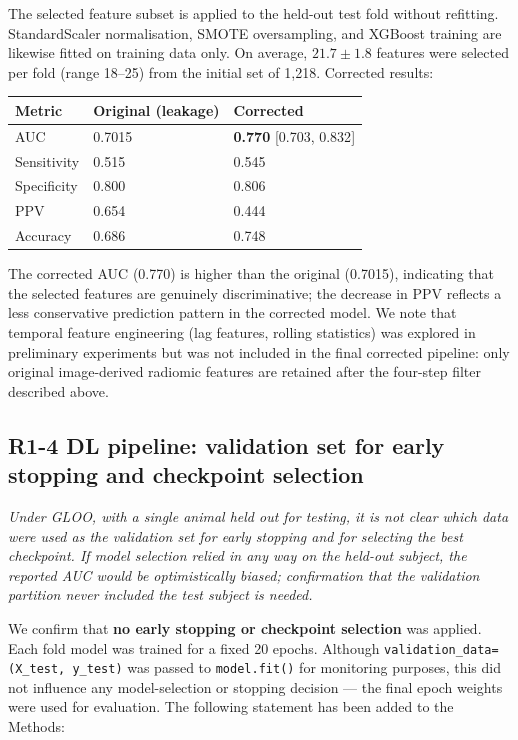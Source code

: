 \documentclass[12pt]{article}
\newcommand{\rc}[1]{\begin{reviewerbox}\itshape #1\end{reviewerbox}}
\begin{document}
The selected feature subset is applied to the held-out test fold without refitting. StandardScaler normalisation, SMOTE oversampling, and XGBoost training are likewise fitted on training data only. On average, $21.7 \pm 1.8$ features were selected per fold (range 18--25) from the initial set of 1,218. Corrected results:

\begin{table}[h]
\centering\small
\begin{tabular}{lll}
\toprule
Metric & Original (leakage) & Corrected \\
\midrule
AUC & 0.7015 & \textbf{0.770} {[}0.703, 0.832{]} \\
Sensitivity & 0.515 & 0.545 \\
Specificity & 0.800 & 0.806 \\
PPV & 0.654 & 0.444 \\
Accuracy & 0.686 & 0.748 \\
\bottomrule
\end{tabular}
\end{table}

The corrected AUC (0.770) is higher than the original (0.7015), indicating that the selected features are genuinely discriminative; the decrease in PPV reflects a less conservative prediction pattern in the corrected model. We note that temporal feature engineering (lag features, rolling statistics) was explored in preliminary experiments but was not included in the final corrected pipeline: only original image-derived radiomic features are retained after the four-step filter described above.

\bigskip

\vspace{6pt}%
\subsection*{R1-4 \quad DL pipeline: validation set for early stopping and checkpoint selection}

\rc{Under GLOO, with a single animal held out for testing, it is not clear which data were used as the validation set for early stopping and for selecting the best checkpoint. If model selection relied in any way on the held-out subject, the reported AUC would be optimistically biased; confirmation that the validation partition never included the test subject is needed.}

We confirm that \textbf{no early stopping or checkpoint selection} was applied. Each fold model was trained for a fixed 20 epochs. Although \texttt{validation\_data=(X\_test, y\_test)} was passed to \texttt{model.fit()} for monitoring purposes, this did not influence any model-selection or stopping decision --- the final epoch weights were used for evaluation. The following statement has been added to the Methods:
\end{document}

